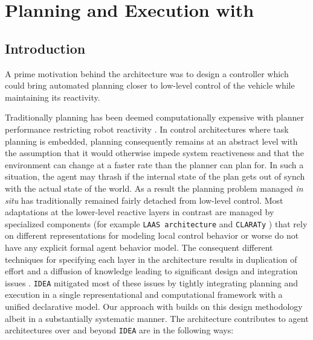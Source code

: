 \section{Planning and Execution with \rx}
\label{sec:arch}

\subsection{Introduction}
\label{sec:arch:intro}

A prime motivation behind the \rx architecture was to design a
controller which could bring automated planning closer to low-level
control of the vehicle while maintaining its reactivity. 

Traditionally planning has been deemed computationally expensive with
planner performance restricting robot reactivity
\cite{ghallab04,Dias:2003ua}. In control architectures where task
planning is embedded, planning consequently remains at an abstract
level with the assumption that it would otherwise impede system
reactiveness and that the environment can change at a faster rate than
the planner can plan for. In such a situation, the agent may thrash if
the internal state of the plan gets out of synch with the actual state
of the world. As a result the planning problem managed {\em in situ}
has traditionally remained fairly detached from low-level
control. Most adaptations at the lower-level reactive layers in
contrast are managed by specialized components (for example
\texttt{LAAS architecture} \cite{alami:1998p820,Ingrand07} and
\texttt{CLARATy} \cite{Nesnas:2003do}) that rely on different
representations for modeling local control behavior or worse do not
have any explicit formal agent behavior model. The consequent
different techniques for specifying each layer in the architecture
results in duplication of effort and a diffusion of knowledge leading
to significant design and integration issues \cite{DS1report}.
\texttt{IDEA} mitigated most of these issues by tightly integrating
planning and execution in a single representational and computational
framework with a unified declarative model. Our approach with \rx
builds on this design methodology albeit in a substantially systematic
manner. The \rx architecture contributes to agent architectures over
and beyond \texttt{IDEA} are in the following ways:

